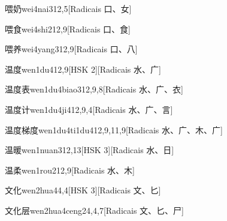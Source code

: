 \begin{entry}{喂奶}{wei4nai3}{12,5}[Radicais ⼝、⼥]
\end{entry}

\begin{entry}{喂食}{wei4shi2}{12,9}[Radicais ⼝、⾷]
\end{entry}

\begin{entry}{喂养}{wei4yang3}{12,9}[Radicais ⼝、⼋]
\end{entry}

\begin{entry}{温度}{wen1du4}{12,9}[HSK 2][Radicais ⽔、⼴]
\end{entry}

\begin{entry}{温度表}{wen1du4biao3}{12,9,8}[Radicais ⽔、⼴、⾐]
\end{entry}

\begin{entry}{温度计}{wen1du4ji4}{12,9,4}[Radicais ⽔、⼴、⾔]
\end{entry}

\begin{entry}{温度梯度}{wen1du4ti1du4}{12,9,11,9}[Radicais ⽔、⼴、⽊、⼴]
\end{entry}

\begin{entry}{温暖}{wen1nuan3}{12,13}[HSK 3][Radicais ⽔、⽇]
\end{entry}

\begin{entry}{温柔}{wen1rou2}{12,9}[Radicais ⽔、⽊]
\end{entry}

\begin{entry}{文化}{wen2hua4}{4,4}[HSK 3][Radicais ⽂、⼔]
\end{entry}

\begin{entry}{文化层}{wen2hua4ceng2}{4,4,7}[Radicais ⽂、⼔、⼫]
\end{entry}


